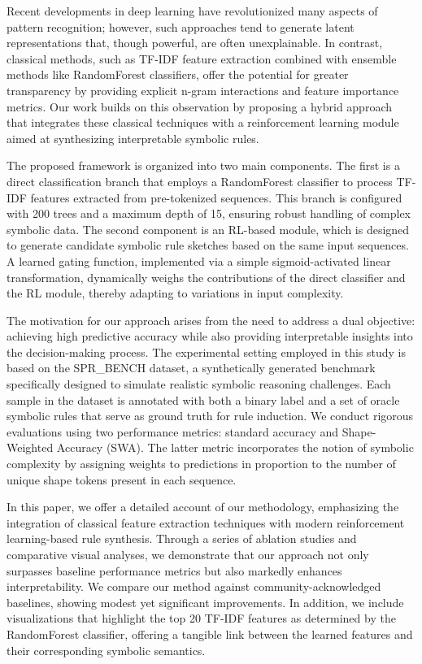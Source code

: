 \documentclass{article}
\begin{document}
Recent developments in deep learning have revolutionized many aspects of pattern recognition; however, such approaches tend to generate latent representations that, though powerful, are often unexplainable. In contrast, classical methods, such as TF-IDF feature extraction combined with ensemble methods like RandomForest classifiers, offer the potential for greater transparency by providing explicit n-gram interactions and feature importance metrics. Our work builds on this observation by proposing a hybrid approach that integrates these classical techniques with a reinforcement learning module aimed at synthesizing interpretable symbolic rules.

The proposed framework is organized into two main components. The first is a direct classification branch that employs a RandomForest classifier to process TF-IDF features extracted from pre-tokenized sequences. This branch is configured with 200 trees and a maximum depth of 15, ensuring robust handling of complex symbolic data. The second component is an RL-based module, which is designed to generate candidate symbolic rule sketches based on the same input sequences. A learned gating function, implemented via a simple sigmoid-activated linear transformation, dynamically weighs the contributions of the direct classifier and the RL module, thereby adapting to variations in input complexity.

The motivation for our approach arises from the need to address a dual objective: achieving high predictive accuracy while also providing interpretable insights into the decision-making process. The experimental setting employed in this study is based on the SPR\_BENCH dataset, a synthetically generated benchmark specifically designed to simulate realistic symbolic reasoning challenges. Each sample in the dataset is annotated with both a binary label and a set of oracle symbolic rules that serve as ground truth for rule induction. We conduct rigorous evaluations using two performance metrics: standard accuracy and Shape-Weighted Accuracy (SWA). The latter metric incorporates the notion of symbolic complexity by assigning weights to predictions in proportion to the number of unique shape tokens present in each sequence.

In this paper, we offer a detailed account of our methodology, emphasizing the integration of classical feature extraction techniques with modern reinforcement learning-based rule synthesis. Through a series of ablation studies and comparative visual analyses, we demonstrate that our approach not only surpasses baseline performance metrics but also markedly enhances interpretability. We compare our method against community-acknowledged baselines, showing modest yet significant improvements. In addition, we include visualizations that highlight the top 20 TF-IDF features as determined by the RandomForest classifier, offering a tangible link between the learned features and their corresponding symbolic semantics.
\end{document}
